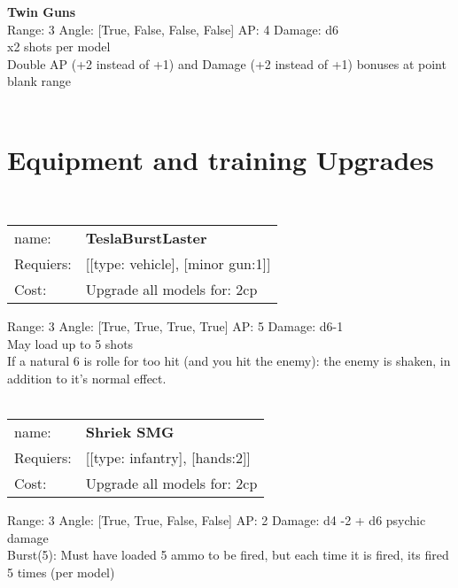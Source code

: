 {\bf Twin Guns } \\



Range: 3  Angle: [True, False, False, False] AP: 4 Damage: d6 \\
x2 shots per model\\ 
Double AP (+2 instead of +1) and Damage (+2 instead of +1) bonuses at point blank range\\ 




 
\ \\

\section{Equipment and training Upgrades}\ \\
\begin{tabular}{ll}
name: & {\bf TeslaBurstLaster } \\
Requiers: & [[type: vehicle], [minor gun:1]] \\
Cost: & Upgrade all models for: 2cp \\
\end{tabular}



Range: 3  Angle: [True, True, True, True] AP: 5 Damage: d6-1 \\
May load up to 5 shots\\ 
If a natural 6 is rolle for too hit (and you hit the enemy): the enemy is shaken, in addition to it's normal effect.\\ 








\ \\
\begin{tabular}{ll}
name: & {\bf Shriek SMG } \\
Requiers: & [[type: infantry], [hands:2]] \\
Cost: & Upgrade all models for: 2cp \\
\end{tabular}



Range: 3  Angle: [True, True, False, False] AP: 2 Damage: d4 -2 + d6 psychic damage \\
Burst(5): Must have loaded 5 ammo to be fired, but each time it is fired, its fired 5 times (per model)\\ 







